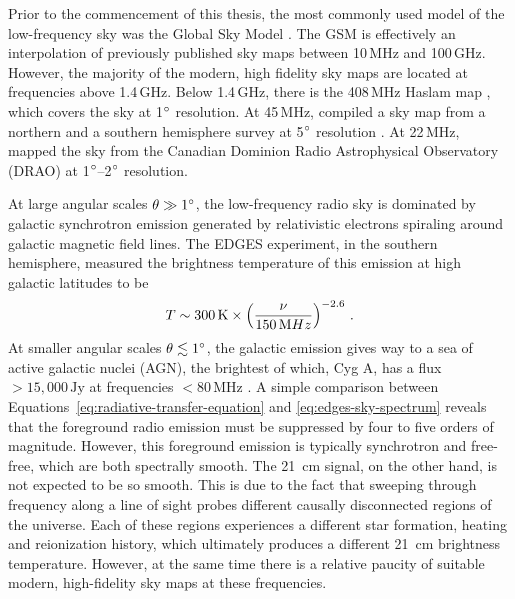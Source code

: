 \begin{bibunit}
Prior to the commencement of this thesis, the most commonly used model of the low-frequency sky was
the Global Sky Model \citep[GSM;][]{2008MNRAS.388..247D}. The GSM is effectively an interpolation of
previously published sky maps between 10\,MHz and 100\,GHz. However, the majority of the modern,
high fidelity sky maps are located at frequencies above 1.4\,GHz. Below 1.4\,GHz, there is the
408\,MHz Haslam map \citep{1981A&A...100..209H,1982A&AS...47....1H}, which covers the sky at
1$\arcdeg$ resolution. At 45\,MHz, \citet{2011A&A...525A.138G} compiled a sky map from a northern
and a southern hemisphere survey at 5$\arcdeg$ resolution \citep{1997A&AS..124..315A,
1999A&AS..140..145M}. At 22\,MHz, \citet{1999A&AS..137....7R} mapped the sky from the Canadian
Dominion Radio Astrophysical Observatory (DRAO) at 1$\arcdeg$--2$\arcdeg$ resolution.



At large angular scales $\theta \gg 1\arcdeg$, the low-frequency radio sky is dominated by galactic
synchrotron emission generated by relativistic electrons spiraling around galactic magnetic field
lines. The EDGES experiment, in the southern hemisphere, measured the brightness temperature of this
emission at high galactic latitudes to be \citep{2017MNRAS.464.4995M}
\begin{equation}\label{eq:edges-sky-spectrum}
    T \sim 300\,{\rm K} \times \left(\frac{\nu}{150\,{\rm MHz}}\right)^{-2.6}\,.
\end{equation}
At smaller angular scales $\theta \lesssim 1\arcdeg$, the galactic emission gives way to a sea of
active galactic nuclei (AGN), the brightest of which, Cyg A, has a flux $>15,000\,\text{Jy}$ at
frequencies $<80\,\text{MHz}$ \citep{1977A&A....61...99B}. A simple comparison between
Equations~\ref{eq:radiative-transfer-equation} and \ref{eq:edges-sky-spectrum} reveals that the
foreground radio emission must be suppressed by four to five orders of magnitude.  However, this
foreground emission is typically synchrotron and free-free, which are both spectrally smooth. The
21~cm signal, on the other hand, is not expected to be so smooth. This is due to the fact that
sweeping through frequency along a line of sight probes different causally disconnected regions of
the universe. Each of these regions experiences a different star formation, heating and reionization
history, which ultimately produces a different 21~cm brightness temperature.  However, at the same
time there is a relative paucity of suitable modern, high-fidelity sky maps at these frequencies.


\end{bibunit}
